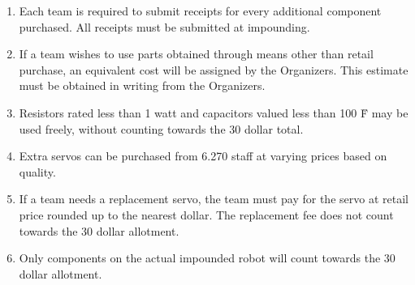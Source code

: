 \begin{enumerate}

 \item Each team is required to submit receipts for every additional
 component purchased. All receipts must be submitted at impounding.

 \item If a team wishes to use parts obtained through means other than
 retail purchase, an equivalent cost will be assigned by the
 Organizers. This estimate must be obtained in writing from the
 Organizers.

 \item Resistors rated less than 1 watt and capacitors valued less
 than 100 \u F may be used freely, without counting towards the 30 dollar
 total.

 \item Extra servos can be purchased from 6.270 staff at varying prices based on quality.

 \item If a team needs a replacement servo, the team must pay for the
 servo at retail price rounded up to the nearest dollar.  The
 replacement fee does not count towards the 30 dollar allotment.

 \item Only components on the actual impounded robot will count
 towards the 30 dollar allotment.

\end{enumerate}
